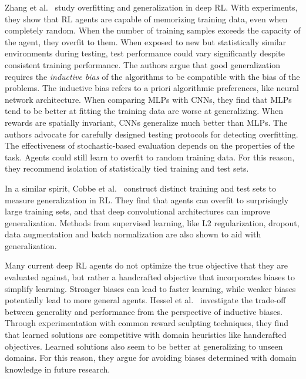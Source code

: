 Zhang et al.~\cite{zhang_overfitting_2018} study overfitting and generalization in deep RL.
With experiments, they show that RL agents are capable of memorizing training data, even when completely random.
When the number of training samples exceeds the capacity of the agent, they overfit to them.
When exposed to new but statistically similar environments during testing, test performance could vary significantly despite consistent training performance.
The authors argue that good generalization requires the \textit{inductive bias} of the algorithms to be compatible with the bias of the problems.
The inductive bias refers to a priori algorithmic preferences, like neural network architecture.
When comparing MLPs with CNNs, they find that MLPs tend to be better at fitting the training data are worse at generalizing.
When rewards are spatially invariant, CNNs generalize much better than MLPs.
The authors advocate for carefully designed testing protocols for detecting overfitting.
The effectiveness of stochastic-based evaluation depends on the properties of the task.
Agents could still learn to overfit to random training data. 
For this reason, they recommend isolation of statistically tied training and test sets.

In a similar spirit, Cobbe et al.~\cite{cobbe_generalization_2019} construct distinct training and test sets to measure generalization in RL.
They find that agents can overfit to surprisingly large training sets, and that deep convolutional architectures can improve generalization.
Methods from supervised learning, like L2 regularization, dropout, data augmentation and batch normalization are also shown to aid with generalization.

Many current deep RL agents do not optimize the true objective that they are evaluated against,
but rather a handcrafted objective that incorporates biases to simplify learning.
Stronger biases can lead to faster learning, while weaker biases potentially lead to more general agents.
Hessel et al.~\cite{hessel_inductive_2019} investigate the trade-off between generality and performance from the perspective of inductive biases.
Through experimentation with common reward sculpting techniques, they find that learned solutions are competitive with domain heuristics like handcrafted objectives.
Learned solutions also seem to be better at generalizing to unseen domains.
For this reason, they argue for avoiding biases determined with domain knowledge in future research.

